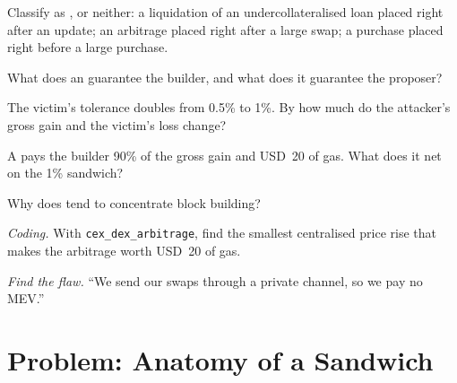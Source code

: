 \begin{exercise}[$\star$]\label{exo:m3:maximal-extractable-value:2}
Classify as ,  or neither: a liquidation of an undercollateralised loan placed right after an  update; an arbitrage
placed right after a large swap; a purchase placed right before a large purchase.
\end{exercise}

\begin{exercise}[$\star$]\label{exo:m3:maximal-extractable-value:3}
What does an  guarantee the builder, and what does it guarantee the proposer?
\end{exercise}

\begin{exercise}[$\star\star$]\label{exo:m3:maximal-extractable-value:4}
The victim's tolerance doubles from 0.5\% to 1\%. By how much do the attacker's gross gain and the victim's loss change?
\end{exercise}

\begin{exercise}[$\star\star$]\label{exo:m3:maximal-extractable-value:5}
A  pays the builder 90\% of the gross gain and USD~20 of gas. What does it net on the 1\% sandwich?
\end{exercise}

\begin{exercise}[$\star\star$]\label{exo:m3:maximal-extractable-value:6}
Why does  tend to concentrate block building?
\end{exercise}

\begin{exercise}[$\star\star\star$]\label{exo:m3:maximal-extractable-value:7}
\emph{Coding.} With \texttt{cex\_dex\_arbitrage}, find the smallest centralised price rise that makes the arbitrage worth USD~20 of gas.
\end{exercise}

\begin{exercise}[$\star\star\star$]\label{exo:m3:maximal-extractable-value:8}
\emph{Find the flaw.} ``We send our swaps through a private channel, so we pay no MEV.''
\end{exercise}

\section{Problem: Anatomy of a Sandwich}

